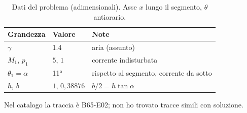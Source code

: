 \documentclass[11pt,a4paper]{article}
\begin{document}
\begin{table}[H]
  \centering
  \begin{tabular}{lll}
    \toprule
    Grandezza & Valore & Note \\
    \midrule
    $\gamma$ & \num{1.4} & aria (assunto) \\
    $M_1$, $p_1$ & $5$, $1$ & corrente indisturbata \\
    $\theta_1=\alpha$ & \ang{11} & rispetto al segmento, corrente da sotto \\
    $h$, $b$ & $1$, $0{,}38876$ & $b/2=h\tan\alpha$ \\
    \bottomrule
  \end{tabular}
  \caption{Dati del problema (adimensionali). Asse $x$ lungo il segmento, $\theta$ antiorario.}
\end{table}

Nel catalogo la traccia è B65-E02; non ho trovato tracce simili con soluzione.

\end{document}
